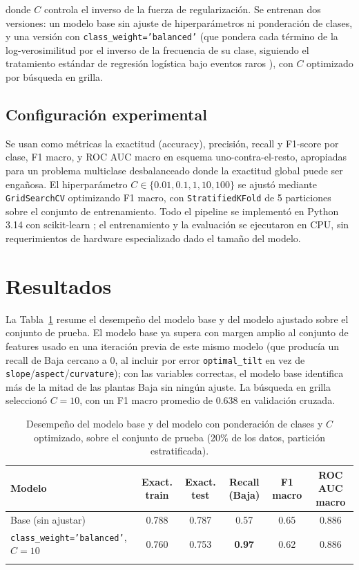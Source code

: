\documentclass[pdflatex,sn-mathphys-num]{sn-jnl}
\begin{document}
\noindent donde $C$ controla el inverso de la fuerza de regularización. Se entrenan dos versiones: un modelo base sin ajuste de hiperparámetros ni ponderación de clases, y una versión con \texttt{class\_weight='balanced'} (que pondera cada término de la log-verosimilitud por el inverso de la frecuencia de su clase, siguiendo el tratamiento estándar de regresión logística bajo eventos raros \cite{bib3}), con $C$ optimizado por búsqueda en grilla.

\subsection{Configuración experimental}\label{subsec:config}

Se usan como métricas la exactitud (accuracy), precisión, recall y F1-score por clase, F1 macro, y ROC AUC macro en esquema uno-contra-el-resto, apropiadas para un problema multiclase desbalanceado donde la exactitud global puede ser engañosa. El hiperparámetro $C \in \{0.01, 0.1, 1, 10, 100\}$ se ajustó mediante \texttt{GridSearchCV} optimizando F1 macro, con \texttt{StratifiedKFold} de 5 particiones sobre el conjunto de entrenamiento. Todo el pipeline se implementó en Python 3.14 con scikit-learn \cite{bib4}; el entrenamiento y la evaluación se ejecutaron en CPU, sin requerimientos de hardware especializado dado el tamaño del modelo.

\section{Resultados}\label{sec:resultados}

La Tabla~\ref{tab:resultados} resume el desempeño del modelo base y del modelo ajustado sobre el conjunto de prueba. El modelo base ya supera con margen amplio al conjunto de features usado en una iteración previa de este mismo modelo (que producía un recall de Baja cercano a 0, al incluir por error \texttt{optimal\_tilt} en vez de \texttt{slope}/\texttt{aspect}/\texttt{curvature}); con las variables correctas, el modelo base identifica más de la mitad de las plantas Baja sin ningún ajuste. La búsqueda en grilla seleccionó $C=10$, con un F1 macro promedio de 0.638 en validación cruzada.

\begin{table}[h]
\caption{Desempeño del modelo base y del modelo con ponderación de clases y $C$ optimizado, sobre el conjunto de prueba (20\% de los datos, partición estratificada).}\label{tab:resultados}
\begin{tabular}{@{}lccccc@{}}
\toprule
Modelo & Exact. train & Exact. test & Recall (Baja) & F1 macro & ROC AUC macro \\
\midrule
Base (sin ajustar) & 0.788 & 0.787 & 0.57 & 0.65 & 0.886 \\
\texttt{class\_weight='balanced'}, $C=10$ & 0.760 & 0.753 & \textbf{0.97} & 0.62 & 0.886 \\
\botrule
\end{tabular}
\end{table}
\end{document}
